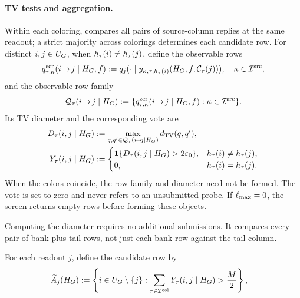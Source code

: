 \paragraph{TV tests and aggregation.}
Within each coloring,  compares all pairs of
source-column replies at the
same readout; a strict majority across colorings determines each candidate row.
For distinct $i,j\in\ResidualPositions$, when
$\ColorHash{\tau}{i}\ne\ColorHash{\tau}{j}$, define the observable rows
\begin{equation}
 \ProbeObservedRow{\tau}{\kappa}{i}{j}
 :=\OracleRow{\ProbeState{\kappa}{\tau}{\ColorHash{\tau}{i}}
            {\ReadoutChunkOf{\tau}{j}}}{j},
 \quad \kappa\in\ScreenColumnSet,
 \label{app:eq:observed-screen-rows}
\end{equation}
and the observable row family
\begin{equation}
 \ObservedRowFamily{\tau}{i}{j}
 :=\{\ProbeObservedRow{\tau}{\kappa}{i}{j}:
          \kappa\in\ScreenColumnSet\}.
 \label{app:eq:observed-row-family}
\end{equation}
Its TV diameter and the corresponding vote are
\begin{align}
 \ScreenDiameter{\tau}{i}{j}
 &:=\max_{q,q'\in\ObservedRowFamily{\tau}{i}{j}}
      \dTV(q,q'),
 \label{app:eq:observed-screen-diameter}\\
 \ScreenVote{\tau}{i}{j}
 &:=\begin{cases}
 \mathbf 1\{\ScreenDiameter{\tau}{i}{j}>2\RowTVError\},
   &\ColorHash{\tau}{i}\ne\ColorHash{\tau}{j},\\
 0,&\ColorHash{\tau}{i}=\ColorHash{\tau}{j}.
 \end{cases}
 \label{app:eq:screen-vote}
\end{align}
When the colors coincide, the row family and diameter need not be formed.
The vote is set to zero and never refers to an unsubmitted probe.  If
$\MaxBankSize=0$, the screen returns empty rows before forming these objects.

Computing the diameter requires no additional submissions.  It compares
every pair of bank-plus-tail rows, not just each bank row against the tail
column.

For each readout $j$, define the candidate row by
\begin{align}
 \CandidateRow{j}
 &:=\left\{
 i\in\ResidualPositions\setminus\{j\}:
 \sum_{\tau\in\ColoringIndexSet}
 \ScreenVote{\tau}{i}{j}>\frac{\ColoringCount}{2}
 \right\},
 \label{app:eq:provisional-row}
\end{align}

